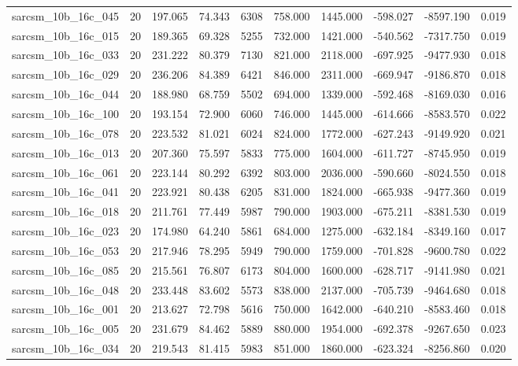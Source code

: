 \begin{tabular}{lrrrrrrrrr}
sarcsm\_10b\_16c\_045 & 20 & 197.065 & 74.343 & 6308 & 758.000 & 1445.000 & -598.027 & -8597.190 & 0.019 \\
sarcsm\_10b\_16c\_015 & 20 & 189.365 & 69.328 & 5255 & 732.000 & 1421.000 & -540.562 & -7317.750 & 0.019 \\
sarcsm\_10b\_16c\_033 & 20 & 231.222 & 80.379 & 7130 & 821.000 & 2118.000 & -697.925 & -9477.930 & 0.018 \\
sarcsm\_10b\_16c\_029 & 20 & 236.206 & 84.389 & 6421 & 846.000 & 2311.000 & -669.947 & -9186.870 & 0.018 \\
sarcsm\_10b\_16c\_044 & 20 & 188.980 & 68.759 & 5502 & 694.000 & 1339.000 & -592.468 & -8169.030 & 0.016 \\
sarcsm\_10b\_16c\_100 & 20 & 193.154 & 72.900 & 6060 & 746.000 & 1445.000 & -614.666 & -8583.570 & 0.022 \\
sarcsm\_10b\_16c\_078 & 20 & 223.532 & 81.021 & 6024 & 824.000 & 1772.000 & -627.243 & -9149.920 & 0.021 \\
sarcsm\_10b\_16c\_013 & 20 & 207.360 & 75.597 & 5833 & 775.000 & 1604.000 & -611.727 & -8745.950 & 0.019 \\
sarcsm\_10b\_16c\_061 & 20 & 223.144 & 80.292 & 6392 & 803.000 & 2036.000 & -590.660 & -8024.550 & 0.018 \\
sarcsm\_10b\_16c\_041 & 20 & 223.921 & 80.438 & 6205 & 831.000 & 1824.000 & -665.938 & -9477.360 & 0.019 \\
sarcsm\_10b\_16c\_018 & 20 & 211.761 & 77.449 & 5987 & 790.000 & 1903.000 & -675.211 & -8381.530 & 0.019 \\
sarcsm\_10b\_16c\_023 & 20 & 174.980 & 64.240 & 5861 & 684.000 & 1275.000 & -632.184 & -8349.160 & 0.017 \\
sarcsm\_10b\_16c\_053 & 20 & 217.946 & 78.295 & 5949 & 790.000 & 1759.000 & -701.828 & -9600.780 & 0.022 \\
sarcsm\_10b\_16c\_085 & 20 & 215.561 & 76.807 & 6173 & 804.000 & 1600.000 & -628.717 & -9141.980 & 0.021 \\
sarcsm\_10b\_16c\_048 & 20 & 233.448 & 83.602 & 5573 & 838.000 & 2137.000 & -705.739 & -9464.680 & 0.018 \\
sarcsm\_10b\_16c\_001 & 20 & 213.627 & 72.798 & 5616 & 750.000 & 1642.000 & -640.210 & -8583.460 & 0.018 \\
sarcsm\_10b\_16c\_005 & 20 & 231.679 & 84.462 & 5889 & 880.000 & 1954.000 & -692.378 & -9267.650 & 0.023 \\
sarcsm\_10b\_16c\_034 & 20 & 219.543 & 81.415 & 5983 & 851.000 & 1860.000 & -623.324 & -8256.860 & 0.020 \\

\end{tabular}
